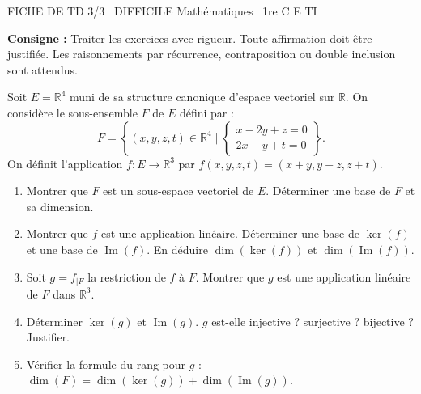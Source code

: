 \documentclass[11pt]{article}
\begin{document}
\begin{tcolorbox}[enhanced,colback=popink,colframe=popink,arc=10pt,boxrule=0pt,left=12pt,right=12pt,top=9pt,bottom=9pt]
{\color{white}\popxbold\small FICHE DE TD 3/3 \textbullet\ DIFFICILE \hfill Mathématiques \textbullet\ 1re C E TI\par}
\end{tcolorbox}
\vspace{4pt}
\noindent \textbf{Consigne :} Traiter les exercices avec rigueur. Toute affirmation doit être justifiée. Les raisonnements par récurrence, contraposition ou double inclusion sont attendus.

\begin{exercice}
Soit $E = \mathbb{R}^4$ muni de sa structure canonique d'espace vectoriel sur $\mathbb{R}$.
On considère le sous-ensemble $F$ de $E$ défini par :
\[
F = \left\{ (x, y, z, t) \in \mathbb{R}^4 \mid \begin{cases} x - 2y + z = 0 \\ 2x - y + t = 0 \end{cases} \right\}.
\]
On définit l'application $f : E \to \mathbb{R}^3$ par $f(x, y, z, t) = (x + y, y - z, z + t)$.

\begin{enumerate}
    \item Montrer que $F$ est un sous-espace vectoriel de $E$. Déterminer une base de $F$ et sa dimension.
    \item Montrer que $f$ est une application linéaire. Déterminer une base de $\ker(f)$ et une base de $\operatorname{Im}(f)$. En déduire $\dim(\ker(f))$ et $\dim(\operatorname{Im}(f))$.
    \item Soit $g = f_{|F}$ la restriction de $f$ à $F$. Montrer que $g$ est une application linéaire de $F$ dans $\mathbb{R}^3$.
    \item Déterminer $\ker(g)$ et $\operatorname{Im}(g)$. $g$ est-elle injective ? surjective ? bijective ? Justifier.
    \item Vérifier la formule du rang pour $g$ : $\dim(F) = \dim(\ker(g)) + \dim(\operatorname{Im}(g))$.
\end{enumerate}
\end{exercice}
\end{document}
